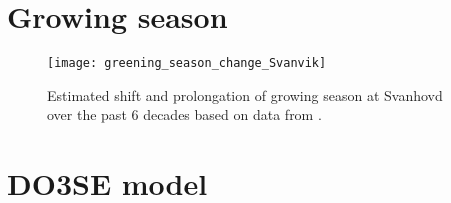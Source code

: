 \documentclass[bg, manuscript]{copernicus}
\begin{document}









\clearpage

\appendix
\section{Growing season}
\label{appendix:growing_season}

\begin{figure*}[th]
  \texttt{[image: greening\_season\_change\_Svanvik]}
  \caption{Estimated shift and prolongation of growing season at Svanhovd over the past 6 decades based on data from \citet{SeNorge}.}
  \label{fig:greening_season_change_Svanvik}
\end{figure*}

\section{DO3SE model}
\label{appendix:do3se_model}
\end{document}
